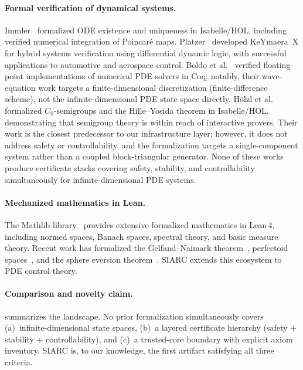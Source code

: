 \documentclass[11pt,a4paper]{article}
\theoremstyle{plain}
\theoremstyle{definition}
\theoremstyle{remark}
\begin{document}
\paragraph{Formal verification of dynamical systems.}
Immler~\cite{ImmlerODE} formalized ODE existence and uniqueness in
Isabelle/HOL, including verified numerical integration of Poincar\'{e}
maps.
Platzer~\cite{PlatzerKeYmaera} developed KeYmaera~X for hybrid systems
verification using differential dynamic logic, with successful
applications to automotive and aerospace control.
Boldo et al.~\cite{BoldoFV} verified floating-point implementations of
numerical PDE solvers in Coq; notably, their wave-equation work targets
a finite-dimensional discretization (finite-difference scheme), not the
infinite-dimensional PDE state space directly.
H\"olzl et al.~\cite{HoelzlSemigroup} formalized
$C_0$-semigroups and the Hille--Yosida theorem in Isabelle/HOL,
demonstrating that semigroup theory is within reach of interactive
provers.  Their work is the closest predecessor to our infrastructure
layer; however, it does not address safety or controllability, and the
formalization targets a single-component system rather than a coupled
block-triangular generator.
None of these works produce certificate stacks covering safety,
stability, and controllability simultaneously for infinite-dimensional
PDE systems.

\paragraph{Mechanized mathematics in Lean.}
The Mathlib library~\cite{Mathlib} provides extensive formalized
mathematics in Lean\,4, including normed spaces, Banach spaces, spectral
theory, and basic measure theory.  Recent work has formalized the
Gelfand--Naimark theorem~\cite{GelfandNaimark}, perfectoid
spaces~\cite{BuzzardPerfectoid}, and the sphere eversion
theorem~\cite{SphereEversion}.  SIARC extends this ecosystem to PDE
control theory.

\paragraph{Comparison and novelty claim.}
 summarizes the landscape.  No prior formalization
simultaneously covers (a)~infinite-dimensional state spaces,
(b)~a layered certificate hierarchy (safety + stability +
controllability), and (c)~a trusted-core boundary with explicit axiom
inventory.  SIARC is, to our knowledge, the first artifact satisfying
all three criteria.
\end{document}
